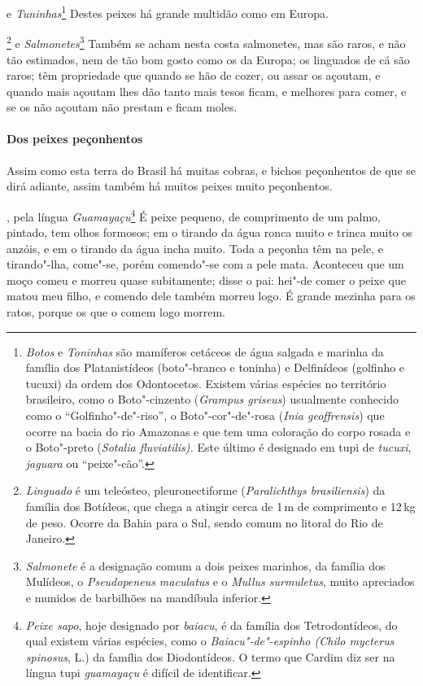 \begin{linenumbers}
 e \textit{Tuninhas}\footnote{ \textit{Botos} e 
\textit{Toninhas} são mamíferos cetáceos de água salgada e marinha da
família dos Platanistídeos (boto"-branco e toninha) e Delfinídeos
(golfinho e tucuxi) da ordem dos Odontocetos. Existem várias espécies
no território brasileiro, como o Boto"-cinzento (\textit{Grampus
griseus}) usualmente conhecido como o ``Golfinho"-de"-riso'', o
Boto"-cor"-de"-rosa (\textit{Inia geoffrensis}) que ocorre na bacia do
rio Amazonas e que tem uma coloração do corpo rosada e o Boto"-preto (\textit{Sotalia fluviatilis).} Este último é designado em tupi de
\textit{tucuxi}, \textit{jaguara} ou ``peixe"-cão''.} Destes
peixes há grande multidão como em Europa. 

\footnote{ \textit{Linguado} é um teleósteo,
pleuronectiforme (\textit{Paralichthys brasiliensis}) da família dos
Botídeos, que chega a atingir cerca de 1\,m de comprimento e
12\,kg de peso. Ocorre da Bahia para o Sul, sendo comum no
litoral do Rio de Janeiro.} e \textit{Salmonetes}\footnote{ \textit{Salmonete} 
é a designação comum a dois peixes marinhos, da
família dos Mulídeos, o \textit{Pseudopeneus maculatus} e o
\textit{Mullus surmuletus}, muito apreciados e munidos de barbilhões na
mandíbula inferior.} Também se acham nesta costa
salmonetes, mas são raros, e não tão estimados, nem de tão bom gosto
como os da Europa; os linguados de cá são raros; têm propriedade que
quando se hão de cozer, ou assar os açoutam, e quando mais açoutam lhes
dão tanto mais tesos ficam, e melhores para comer, e se os não açoutam
não prestam e ficam moles.

\paragraph{Dos peixes peçonhentos}\quad
Assim como esta terra do Brasil há muitas cobras, e bichos
peçonhentos de que se dirá adiante, assim também há muitos peixes muito
peçonhentos.

, pela língua \textit{Guamayaçu}\footnote{ \textit{Peixe sapo}, 
hoje designado por \textit{baiacu}, é da família
dos Tetrodontídeos, do qual existem várias espécies, como o
\textit{Baiacu"-de"-espinho (Chilo mycterus spinosus}, L.) da família dos
Diodontídeos. O termo que Cardim diz ser na língua tupi
\textit{guamayaçu} é difícil de identificar.} É peixe
pequeno, de comprimento de um palmo, pintado, tem olhos formosos; em o
tirando da água ronca muito e trinca muito os anzóis, e em o tirando da
água incha muito. Toda a peçonha têm na pele, e tirando"-lha, come"-se,
porém comendo"-se com a pele mata. Aconteceu que um moço comeu e morreu
quase subitamente; disse o pai: hei"-de comer o peixe que matou meu
filho, e comendo dele também morreu logo. É grande mezinha para os
ratos, porque os que o comem logo morrem.


\end{linenumbers}
